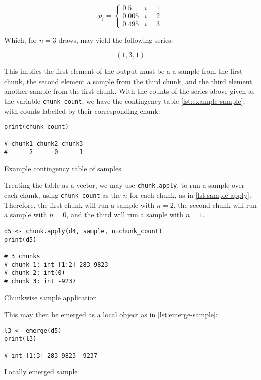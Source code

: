 \begin{equation}\label{eqn:prob-dens}
    p_i = \begin{cases}
        0.5   & i=1 \\
        0.005 & i=2 \\
        0.495 & i=3
    \end{cases}
\end{equation}


Which, for \(n=3\) draws, may yield the following series:

\[
    (1, 3, 1)
\]

This implies the first element of the output must be a a sample from the
first chunk, the second element a sample from the third chunk, and the
third element another sample from the first chunk. With the counts of
the series above given as the variable \texttt{chunk\_count}, we have
the contingency table \ref{lst:example-sample}, with counts labelled by their
corresponding chunk:

\begin{listing}
    \begin{verbatim}
print(chunk_count)

# chunk1 chunk2 chunk3 
#      2      0      1 
    \end{verbatim}
    \caption{Example contingency table of samples}
    \label{lst:example-sample}
\end{listing}

Treating the table as a vector, we may use \texttt{chunk.apply}, to run
a sample over each chunk, using \texttt{chunk\_count} as the \(n\) for
each chunk, as in \ref{lst:sample-apply}. Therefore, the first chunk will run a sample with \(n=2\),
the second chunk will run a sample with \(n=0\), and the third will run
a sample with \(n=1\).

\begin{listing}
    \begin{verbatim}
d5 <- chunk.apply(d4, sample, n=chunk_count)
print(d5)

# 3 chunks
# chunk 1: int [1:2] 283 9823
# chunk 2: int(0)
# chunk 3: int -9237
    \end{verbatim}
    \caption{Chunkwise sample application}
    \label{lst:sample-apply}
\end{listing}

This may then be emerged as a local object as in \ref{lst:emerge-sample}:

\begin{listing}
    \begin{verbatim}
l3 <- emerge(d5)
print(l3)

# int [1:3] 283 9823 -9237
    \end{verbatim}
    \caption{Locally emerged sample}
    \label{lst:emerge-sample}
\end{listing}

